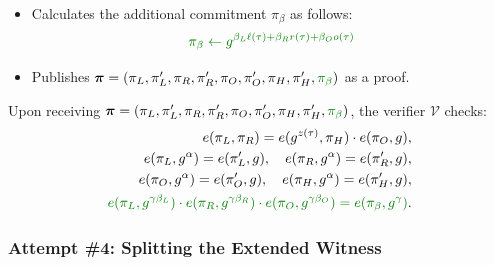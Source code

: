 \documentclass[../../book.tex]{subfiles}
\begin{document}
\begin{tcolorbox}
\begin{itemize}[label=]
\begin{align*}
            \pi_L \gets g^{\ell(\tau)}, \quad \pi_L' \gets g^{\alpha \ell(\tau)}, \\
            \pi_R \gets g^{r(\tau)}, \quad \pi_R' \gets g^{\alpha r(\tau)}, \\
            \pi_O \gets g^{o(\tau)}, \quad \pi_O' \gets g^{\alpha o(\tau)}, \\
            \pi_H \gets g^{h(\tau)}, \quad \pi_H' \gets g^{\alpha h(\tau)}.
        \end{align*}
        \item \textcolor{green!50!black}{Calculates the additional commitment $\pi_{\beta}$ as follows:}
        \begin{equation*}
            \textcolor{green!50!black}{\pi_{\beta} \gets g^{\beta_L\ell(\tau) + \beta_Rr(\tau) + \beta_Oo(\tau)}}
        \end{equation*}
        \item Publishes $\boldsymbol{\pi} = (\pi_L,\pi_L',\pi_R,\pi_R',\pi_O,\pi_O',\pi_H,\pi_H',\textcolor{green!50!black}{\pi_{\beta}})$ as a proof.
    \end{itemize}

    \newpage

    Upon receiving $\boldsymbol{\pi} = (\pi_L,\pi_L',\pi_R,\pi_R',\pi_O,\pi_O',\pi_H,\pi_H',\textcolor{green!50!black}{\pi_{\beta}})$, the verifier $\mathcal{V}$ checks:
    \begin{align*}
        e(\pi_L, \pi_R) = e(g^{z(\tau)}, \pi_H) \cdot e(\pi_O, g), \\
        e(\pi_L, g^{\alpha}) = e(\pi_L', g), \quad e(\pi_R, g^{\alpha}) = e(\pi_R', g), \\
        e(\pi_O, g^{\alpha}) = e(\pi_O', g), \quad e(\pi_H, g^{\alpha}) = e(\pi_H', g), \\
        \textcolor{green!50!black}{e(\pi_L, g^{\gamma\beta_L}) \cdot e(\pi_R, g^{\gamma\beta_R}) \cdot e(\pi_O, g^{\gamma\beta_O}) = e(\pi_{\beta}, g^{\gamma})}.
    \end{align*}
\end{tcolorbox}

\subsubsection{Attempt \#4: Splitting the Extended Witness}
\end{document}
